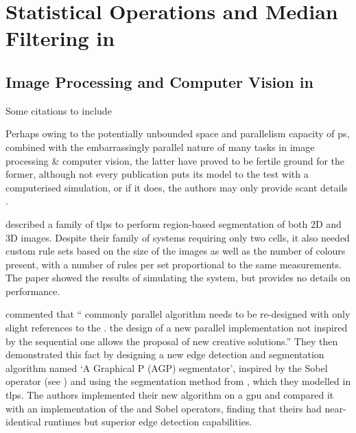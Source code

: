 \newcommand{\hopac}{Hopac}
\chapter{\label{chap:median}Statistical Operations and Median Filtering in }





\section{\label{subsec:imgprocpsys}Image Processing and Computer Vision in }
\begin{anfxwarning}{Some citations to include}
\cite{Zhang2012,Yuan2019}
\end{anfxwarning}

Perhaps owing to the potentially unbounded space and parallelism capacity of \gls{ps}, combined with the embarrassingly parallel nature of many tasks in image processing \& computer vision, the latter have proved to be fertile ground for the former, although not every publication puts its model to the test with a computerised simulation, or if it does, the authors may only provide scant details \cite{Diaz-Pernil2019}.

\citeauthor{Christinal2011} \cite{Christinal2011} described a family of \gls{tlps} to perform region-based segmentation of both 2D and 3D images.  Despite their family of systems requiring only two cells, it also needed custom rule sets based on the size of the images as well as the number of colours present, with a number of rules per set proportional to the same measurements.  The paper showed the results of simulating the system, but provides no details on performance.

\citeauthor{Diaz-Pernil2013} \cite{Diaz-Pernil2013} commented that \enquote{\textelp{} commonly  parallel algorithm needs to be re-designed with only slight references to the .  \textelp{} the design of a new parallel implementation not inspired by the sequential one allows \textelp{} the proposal of new creative solutions.}  They then demonstrated this fact by designing a new edge detection and segmentation algorithm named `A Graphical P (AGP) segmentator', inspired by the Sobel operator (see \eg{} \cite{Nixon2012}) and using the segmentation method from \cite{Christinal2011}, which they modelled in \gls{tlps}.  The authors implemented their new algorithm on a \gls{gpu} and compared it with an implementation of the  and  Sobel operators, finding that theirs had near-identical runtimes but superior edge detection capabilities.

